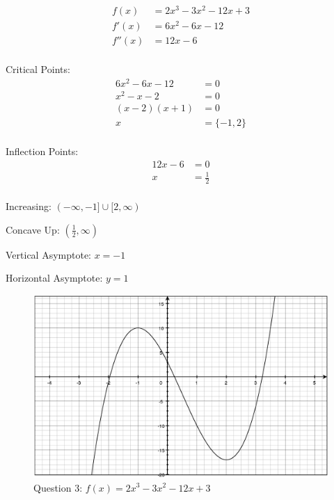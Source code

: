 \documentclass[fleqn]{exam}
\begin{document}
\begin{description}
\pagebreak

\item[3]
\begin{align*}
  f(x) &= 2x^3 - 3x^2 - 12x + 3 \\
  f'(x) &= 6x^2 - 6x - 12 \\
  f''(x) &= 12x - 6 \\
\end{align*}

Critical Points:
\begin{align*}
  6x^2 - 6x - 12 &= 0 \\
  x^2 - x - 2 &= 0 \\
  (x - 2)(x + 1) &= 0 \\
  x &= \{-1, 2\} \\
\end{align*}

Inflection Points:
\begin{align*}
  12x - 6 &= 0 \\
  x &= \frac{1}{2} \\
\end{align*}

\begin{itemize*}
  \item Increasing: $(-\infty, -1] \cup [2, \infty)$
  \item Concave Up: $\left(\frac{1}{2}, \infty \right)$
  \item Vertical Asymptote: $x = -1$
  \item Horizontal Asymptote: $y = 1$
\end{itemize*}

\begin{figure}[H]
  \centering
  \includegraphics[scale=.3]{4.7.3.eps}
  \caption*{Question 3: $f(x) = 2x^3 - 3x^2 - 12x + 3$}
\end{figure}


\end{description}
\end{document}
